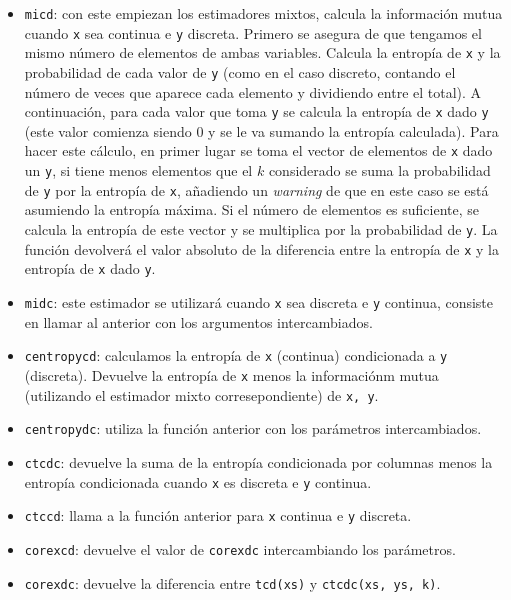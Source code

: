 \documentclass[10pt,a4paper]{article} %
\theoremstyle{definition}
\begin{document}
\begin{itemize}
\item \texttt{micd}: con este empiezan los estimadores mixtos, calcula la información mutua cuando \texttt{x} sea continua e \texttt{y} discreta. Primero se asegura de que tengamos el mismo número de elementos de ambas variables. Calcula la entropía de \texttt{x} y la probabilidad de cada valor de \texttt{y} (como en el caso discreto, contando el número de veces que aparece cada elemento y dividiendo entre el total). A continuación, para cada valor que toma \texttt{y} se calcula la entropía de \texttt{x} dado \texttt{y} (este valor comienza siendo 0 y se le va sumando la entropía calculada). Para hacer este cálculo, en primer lugar se toma el vector de elementos de \texttt{x} dado un \texttt{y}, si tiene menos elementos que el $k$ considerado se suma la probabilidad de \texttt{y} por la entropía de \texttt{x}, añadiendo un \textit{warning} de que en este caso se está asumiendo la entropía máxima. Si el número de elementos es suficiente, se calcula la entropía de este vector y se multiplica por la probabilidad de \texttt{y}. La función devolverá el valor absoluto de la diferencia entre la entropía de \texttt{x} y la entropía de \texttt{x} dado \texttt{y}.

\item \texttt{midc}: este estimador se utilizará cuando \texttt{x} sea discreta e \texttt{y} continua, consiste en llamar al anterior con los argumentos intercambiados.

\item \texttt{centropycd}: calculamos la entropía de \texttt{x} (continua) condicionada a \texttt{y} (discreta). Devuelve la entropía de \texttt{x} menos la informaciónm mutua (utilizando el estimador mixto corresepondiente) de \texttt{x, y}.

\item \texttt{centropydc}: utiliza la función anterior con los parámetros intercambiados.

\item \texttt{ctcdc}: devuelve la suma de la entropía condicionada por columnas menos la entropía condicionada cuando \texttt{x} es discreta e \texttt{y} continua.

\item \texttt{ctccd}: llama a la función anterior para \texttt{x} continua e \texttt{y} discreta.

\item \texttt{corexcd}: devuelve el valor de \texttt{corexdc} intercambiando los parámetros.

\item \texttt{corexdc}: devuelve la diferencia entre \texttt{tcd(xs)} y \texttt{ctcdc(xs, ys, k)}.


\end{itemize}
\end{document}
